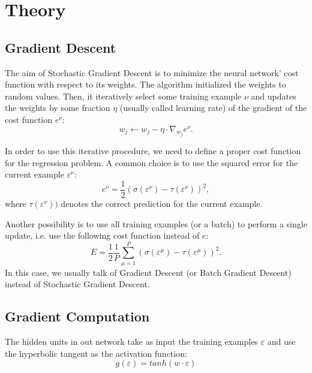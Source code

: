 \section{Theory}
\label{sec:theory}

\subsection{Gradient Descent}
The aim of Stochastic Gradient Descent is to minimize the neural network' cost function with respect to its weights.
The algorithm initialized the weights to random values.
Then, it iteratively select some training example $\nu$ and updates the weights by some fraction $\eta$ (usually called learning rate) of the gradient of the cost function $e^\nu$:
\begin{equation}
    \label{eq:weights-update}
    w_j \leftarrow w_j - \eta \cdot \nabla_{w_j} e^\nu.
\end{equation}

In order to use this iterative procedure, we need to define a proper cost function for the regression problem.
A common choice is to use the squared error for the current example $\varepsilon^\nu$:
\begin{equation}
    \label{eq:cost}
    e^\nu = \frac{1}{2} (\sigma(\varepsilon^\nu) - \tau(\varepsilon^\nu))^2,
\end{equation}
where $\tau(\varepsilon^\nu))$ denotes the correct prediction for the current example.

Another possibility is to use all training examples (or a batch) to perform a single update, i.e. use the following cost function instead of $e$:
\begin{equation}
    E = \frac{1}{2} \frac{1}{P} \sum_{\mu = 1}^{P} (\sigma(\varepsilon^\mu) - \tau(\varepsilon^\mu))^2.
\end{equation}
In this case, we usually talk of Gradient Descent (or Batch Gradient Descent) instead of Stochastic Gradient Descent.

\subsection{Gradient Computation}
The hidden units in out network take as input the training examples $\varepsilon$ and use the hyperbolic tangent as the activation function:
\begin{equation}
    g(\varepsilon) = tanh(w \cdot \varepsilon)
\end{equation}

